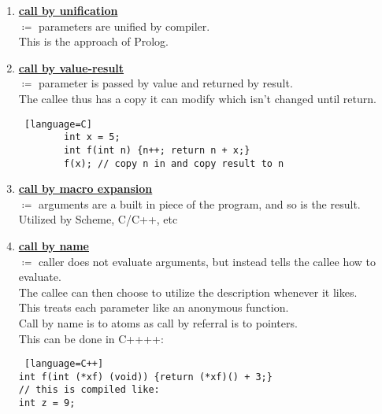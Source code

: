 \documentclass[../../lecture_notes.tex]{subfiles}
\begin{document}
\begin{enumerate} [itemsep=0mm]
		$\coloneqq$ caller tells callee where the result should go, and the result is copied there\\
		This lets a function return a varying result.\\
		This lets functions communicate in the opposite direction as call by value.\\
		The variable is instantiated on call and initialized on return.\\
		This is commonly used in ‘Ada’, but is used in C as well:
		\begin{lstlisting} [language=C]
<unistd.h>
  ssize_t read(int filedes, void *buf, size_t nbyte);
  // buf is really a call by result!
		\end{lstlisting}
	\item \textbf{\underline{call by unification}}\\
		$\coloneqq$ parameters are unified by compiler.\\
		This is the approach of Prolog.
	\item \textbf{\underline{call by value-result}}\\
		$\coloneqq$ parameter is passed by value and returned by result.\\
		The callee thus has a copy it can modify which isn’t changed until return.
		\begin{lstlisting} [language=C]
		int x = 5;
		int f(int n) {n++; return n + x;}
		f(x); // copy n in and copy result to n
		\end{lstlisting}
	\item \textbf{\underline{call by macro expansion}}\\
		$\coloneqq$ arguments are a built in piece of the program, and so is the result.\\
		Utilized by Scheme, C/C++, etc
	\item \textbf{\underline{call by name}}\\
		$\coloneqq$ caller does not evaluate arguments, but instead tells the callee how to evaluate.\\
		The callee can then choose to utilize the description whenever it likes.\\
		This treats each parameter like an anonymous function.\\
		Call by name is to atoms as call by referral is to pointers.\\
		This can be done in C++++:
		\begin{lstlisting} [language=C++]
int f(int (*xf) (void)) {return (*xf)() + 3;}
// this is compiled like:
int z = 9;

\end{lstlisting}
\end{enumerate}
\end{document}
